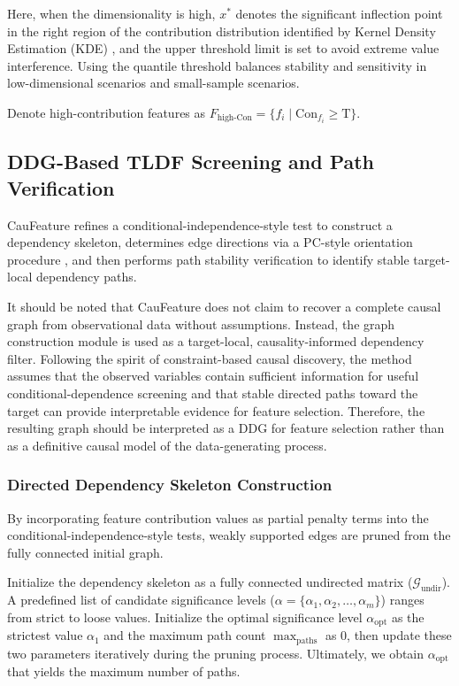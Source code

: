 \documentclass[journal]{IEEEtran}
\begin{document}
Here, when the dimensionality is high, \(x^{*}\) denotes the significant inflection point in the right region of the contribution distribution identified by Kernel Density Estimation (KDE) \cite{weglarczyk2018kernel}, and the upper threshold limit is set to avoid extreme value interference. Using the quantile threshold balances stability and sensitivity in low-dimensional scenarios and small-sample scenarios. 

Denote high-contribution features as $F_{\text{high-Con}} = \{ f_i \mid \text{Con}_{f_i} \geq \text{T} \}$.

\subsection{DDG-Based TLDF Screening and Path Verification}
CauFeature refines a conditional-independence-style test to construct a dependency skeleton, determines edge directions via a PC-style orientation procedure \cite{spirtes2000causation}, and then performs path stability verification to identify stable target-local dependency paths.

It should be noted that CauFeature does not claim to recover a complete causal graph from observational data without assumptions. Instead, the graph construction module is used as a target-local, causality-informed dependency filter. Following the spirit of constraint-based causal discovery, the method assumes that the observed variables contain sufficient information for useful conditional-dependence screening and that stable directed paths toward the target can provide interpretable evidence for feature selection. Therefore, the resulting graph should be interpreted as a DDG for feature selection rather than as a definitive causal model of the data-generating process.

\subsubsection{Directed Dependency Skeleton Construction}
By incorporating feature contribution values as partial penalty terms into the conditional-independence-style tests, weakly supported edges are pruned from the fully connected initial graph.

Initialize the dependency skeleton as a fully connected undirected matrix ($\mathcal{G}_{\text{undir}}$). A predefined list of candidate significance levels ($\alpha=\{\alpha_1,\alpha_2,\dots,\alpha_m\}$) ranges from strict to loose values. Initialize the optimal significance level $\alpha_{\text{opt}}$ as the strictest value $\alpha_1$ and the maximum path count $\max_{\text{paths}}$ as 0, then update these two parameters iteratively during the pruning process. Ultimately, we obtain $\alpha_{\text{opt}}$ that yields the maximum number of paths.
\end{document}
